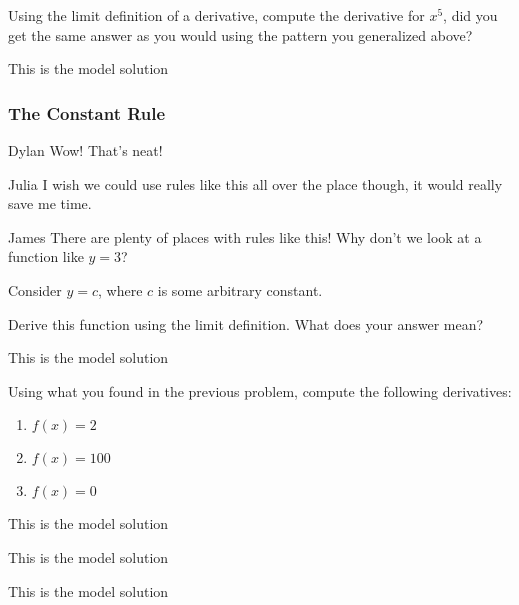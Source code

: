 \documentclass{ximera}
\begin{document}
\begin{question}
Using the limit definition of a derivative, compute the derivative for $x^5$, did you get the same answer as you would using the pattern you generalized above?
\begin{freeResponse}
This is the model solution %
\end{freeResponse}
\end{question}


\subsubsection{The Constant Rule}
\begin{dialogue}
\item[Dylan] Wow! That's neat!
\item[Julia] I wish we could use rules like this all over the place though, it would really save me time.
\item[James] There are plenty of places with rules like this! Why don't we look at a function like $y = 3$?
\end{dialogue}

Consider $y = c$, where $c$ is some arbitrary constant.
\begin{question}
Derive this function using the limit definition. What does your answer mean?
\begin{freeResponse}
This is the model solution %
\end{freeResponse}
\end{question}

\begin{question}
Using what you found in the previous problem, compute the following derivatives:
\begin{enumerate}
\item{$f(x)=2$}
\item{$f(x)=100$}
\item{$f(x)=0$}
\end{enumerate}
\begin{freeResponse}
This is the model solution %
\end{freeResponse}
\begin{freeResponse}
This is the model solution %
\end{freeResponse}
\begin{freeResponse}
This is the model solution %
\end{freeResponse}
\end{question}
\end{document}
